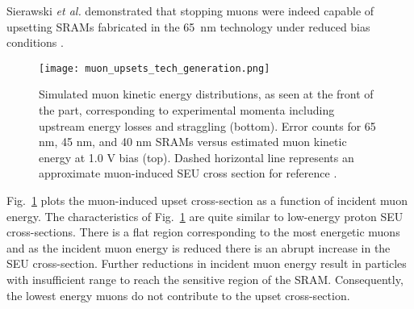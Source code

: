 Sierawski \emph{et al.} demonstrated that stopping muons were indeed capable of upsetting SRAMs fabricated in the 65~nm technology under reduced bias conditions \cite{Sierawski:2010cj}.
\begin{figure}[htbp]
    \begin{center}
        \texttt{[image: muon\_upsets\_tech\_generation.png]}
    \end{center}
    \caption[Simulated muon kinetic energy distributions, as seen at the front of the part, corresponding to experimental momenta including upstream energy losses and straggling (bottom). Error counts for 65 nm, 45 nm, and 40 nm SRAMs versus estimated muon kinetic energy at 1.0 V bias (top). Dashed horizontal line represents an approximate muon-induced SEU cross section for reference.]{Simulated muon kinetic energy distributions, as seen at the front of the part, corresponding to experimental momenta including upstream energy losses and straggling (bottom). Error counts for 65 nm, 45 nm, and 40 nm SRAMs versus estimated muon kinetic energy at 1.0 V bias (top). Dashed horizontal line represents an approximate muon-induced SEU cross section for reference \cite{Sierawski:2010cj}.}
    \label{fig:muon_upsets_energy_dep}
\end{figure}
Fig.~\ref{fig:muon_upsets_energy_dep} plots the muon-induced upset cross-section as a function of incident muon energy.
The characteristics of Fig.~\ref{fig:muon_upsets_energy_dep} are quite similar to low-energy proton SEU cross-sections.
There is a flat region corresponding to the most energetic muons and as the incident muon energy is reduced there is an abrupt increase in the SEU cross-section.
Further reductions in incident muon energy result in particles with insufficient range to reach the sensitive region of the SRAM.
Consequently, the lowest energy muons do not contribute to the upset cross-section.

